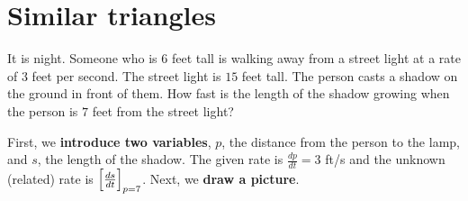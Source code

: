\documentclass{ximera}
\begin{document}
\section{Similar triangles}

\begin{example}
  It is night. Someone who is $6$ feet tall is walking away from a
  street light at a rate of $3$ feet per second.  The street light is
  $15$ feet tall.  The person casts a shadow on the ground in front of
  them. How fast is the length of the shadow growing when the person
  is $7$ feet from the street light?

  \begin{explanation}
  First, we \textbf{introduce two variables}, $p$, the distance from the person to the lamp, and  $s$, the length of the shadow.
  The given rate is $\frac{dp}{dt}=3$ ft/s and the unknown (related) rate is $\Bigl[\frac{ds}{dt}\Bigr]_{p=7}$.
    Next, we \textbf{draw a picture}.
    \begin{image}
    \end{image}


\end{explanation}
\end{example}
\end{document}
